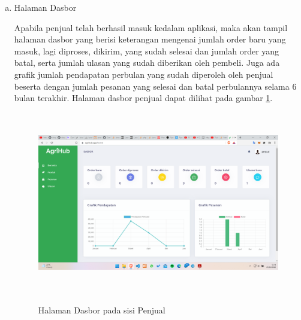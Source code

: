 \begin{enumerate}
\begin{enumerate}[a.]
		\newpage
		\item Halaman Dasbor
		\par Apabila penjual telah berhasil masuk kedalam aplikasi, maka akan tampil halaman dasbor yang berisi keterangan mengenai jumlah order baru yang masuk, lagi diproses, dikirim, yang sudah selesai dan jumlah order yang batal, serta jumlah ulasan yang sudah diberikan oleh pembeli. Juga ada grafik jumlah pendapatan perbulan yang sudah diperoleh oleh penjual beserta dengan jumlah pesanan yang selesai dan batal perbulannya selama 6 bulan terakhir. Halaman dasbor penjual dapat dilihat pada gambar \ref*{dashboard_penjual}.
		\begin{figure}[H]
			\centering
			{\includegraphics [width = 13.3cm, height= 8cm]{gambar/penjual/dashboard_penjual}}
			\caption{Halaman Dasbor pada sisi Penjual}
			\label{dashboard_penjual}
		\end{figure}


\end{enumerate}
\end{enumerate}
